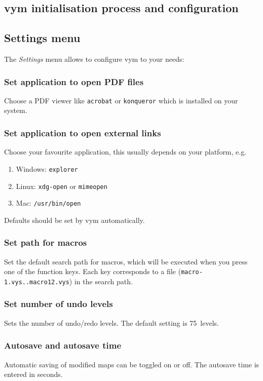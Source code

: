 \documentclass[12pt,a4paper]{article}
\newcommand{\vym}{{\sc vym }}
\begin{document}
\newpage

\begin{appendix}

\section{\vym initialisation process and configuration}
\subsection {Settings menu} \label{settings}
    The {\em Settings} menu allows to configure \vym to your needs:

\subsubsection*{Set application to open PDF files} Choose a PDF
    viewer like {\tt acrobat} or {\tt konqueror} which is installed on
    your system.

\subsubsection*{Set application to open external links}
    Choose your favourite application, this usually depends on your
    platform, e.g.
    \begin{enumerate}
        \item Windows: {\tt explorer}
        \item Linux: {\tt xdg-open} or {\tt mimeopen}
        \item Mac: {\tt /usr/bin/open}
    \end{enumerate}
    Defaults should be set by \vym automatically.

\subsubsection*{Set path for macros}
    Set the default search path for macros, which will be executed when
    you press one of the function keys. Each key corresponds to a file
    ({\tt macro-1.vys..macro12.vys}) in the search path.

\subsubsection*{Set number of undo levels}
    Sets the number of undo/redo levels. The default setting is
    75~levels.

\subsubsection*{Autosave and autosave time}
    Automatic saving of modified maps can be toggled on or off. The
    autosave time is entered in seconds.


\end{appendix}
\end{document}
